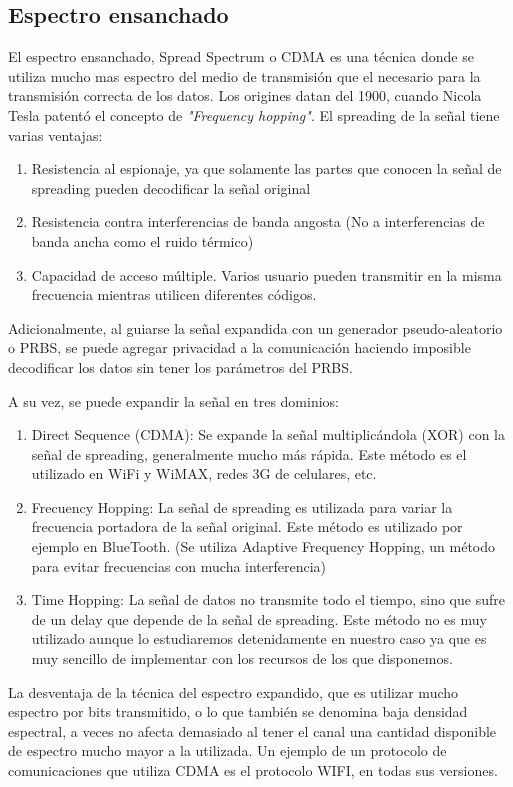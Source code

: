 \subsection{Espectro ensanchado}
\label{espectroensanchado}
El espectro ensanchado, Spread Spectrum o CDMA es una técnica donde se utiliza mucho mas espectro del medio de transmisión que el necesario para la transmisión correcta de los datos.
Los origines datan del 1900, cuando Nicola Tesla patentó el concepto de \textit{"Frequency hopping"}.
El spreading de la señal tiene varias ventajas:
\begin{enumerate} 
\item Resistencia al espionaje, ya que solamente las partes que conocen la señal de spreading pueden decodificar la señal original
\item Resistencia contra interferencias de banda angosta (No a interferencias de banda ancha como el ruido térmico)
\item Capacidad de acceso múltiple. Varios usuario pueden transmitir en la misma frecuencia mientras utilicen diferentes códigos.
\end{enumerate} 
Adicionalmente, al guiarse la señal expandida con un generador pseudo-aleatorio o PRBS, se puede agregar privacidad a la comunicación haciendo imposible decodificar los datos sin tener los parámetros del PRBS.

A su vez, se puede expandir la señal en tres dominios:
\begin{enumerate} 
\item Direct Sequence (CDMA): Se expande la señal multiplicándola (XOR) con la señal de spreading, generalmente mucho más rápida. Este método es el utilizado en WiFi y WiMAX, redes 3G de celulares, etc.
\item Frecuency Hopping: La señal de spreading es utilizada para variar la frecuencia portadora de la señal original. Este método es utilizado por ejemplo en BlueTooth. (Se utiliza Adaptive Frequency Hopping, un método para evitar frecuencias con mucha interferencia)
\item Time Hopping: La señal de datos no transmite todo el tiempo, sino que sufre de un delay que depende de la señal de spreading. Este método no es muy utilizado aunque lo estudiaremos detenidamente en nuestro caso ya que es muy sencillo de implementar con los recursos de los que disponemos.
\end{enumerate} 


La desventaja de la técnica del espectro expandido, que es utilizar mucho espectro por bits transmitido, o lo que también se denomina baja densidad espectral, a veces no afecta demasiado al tener el canal una cantidad disponible de espectro mucho mayor a la utilizada. Un ejemplo de un protocolo de comunicaciones que utiliza CDMA es el protocolo WIFI, en todas sus versiones.

